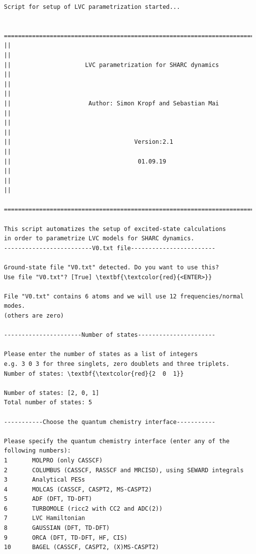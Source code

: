 \documentclass[a4paper,11pt,DIV=15,openany]{scrbook}
\begin{document}
\begin{oframed}
\footnotesize\begin{Verbatim}[commandchars=\\\{\}]
Script for setup of LVC parametrization started...

  ================================================================================
||                                                                                ||
||                     LVC parametrization for SHARC dynamics                     ||
||                                                                                ||
||                      Author: Simon Kropf and Sebastian Mai                     ||
||                                                                                ||
||                                   Version:2.1                                  ||
||                                    01.09.19                                    ||
||                                                                                ||
  ================================================================================

This script automatizes the setup of excited-state calculations
in order to parametrize LVC models for SHARC dynamics.
-------------------------V0.txt file------------------------

Ground-state file "V0.txt" detected. Do you want to use this?
Use file "V0.txt"? [True] \textbf{\textcolor{red}{<ENTER>}}

File "V0.txt" contains 6 atoms and we will use 12 frequencies/normal modes.
(others are zero)

----------------------Number of states----------------------

Please enter the number of states as a list of integers
e.g. 3 0 3 for three singlets, zero doublets and three triplets.
Number of states: \textbf{\textcolor{red}{2  0  1}}

Number of states: [2, 0, 1]
Total number of states: 5

-----------Choose the quantum chemistry interface-----------

Please specify the quantum chemistry interface (enter any of the following numbers):
1       MOLPRO (only CASSCF)
2       COLUMBUS (CASSCF, RASSCF and MRCISD), using SEWARD integrals
3       Analytical PESs
4       MOLCAS (CASSCF, CASPT2, MS-CASPT2)
5       ADF (DFT, TD-DFT)
6       TURBOMOLE (ricc2 with CC2 and ADC(2))
7       LVC Hamiltonian
8       GAUSSIAN (DFT, TD-DFT)
9       ORCA (DFT, TD-DFT, HF, CIS)
10      BAGEL (CASSCF, CASPT2, (X)MS-CASPT2)


\end{Verbatim}
\end{oframed}
\end{document}
